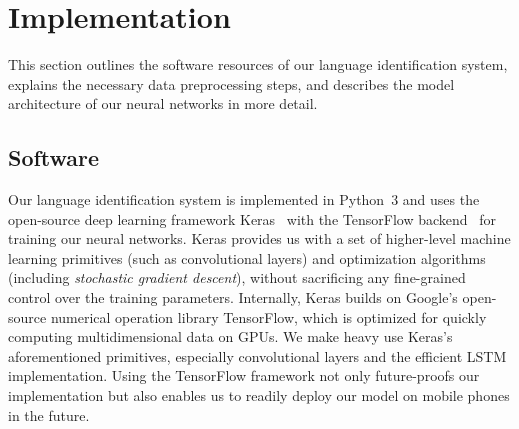 \section{Implementation}
\label{sec:implementation}
This section outlines the software resources of our language identification system, explains the necessary data preprocessing steps, and describes the model architecture of our neural networks in more detail.

\subsection{Software}
\label{sec:software}

	Our language identification system is implemented in Python~3 and uses the open-source deep learning framework Keras~\cite{chollet2015keras} with the TensorFlow backend~\cite{abadi2016tensorflow} for training our neural networks. Keras provides us with a set of higher-level machine learning primitives (such as convolutional layers) and optimization algorithms (including \emph{stochastic gradient descent}), without sacrificing any fine-grained control over the training parameters. Internally, Keras builds on Google's open-source numerical operation library TensorFlow, which is optimized for quickly computing multidimensional data on GPUs. We make heavy use Keras's aforementioned primitives, especially convolutional layers and the efficient LSTM implementation. Using the TensorFlow framework not only future-proofs our implementation but also enables us to readily deploy our model on mobile phones in the future.

